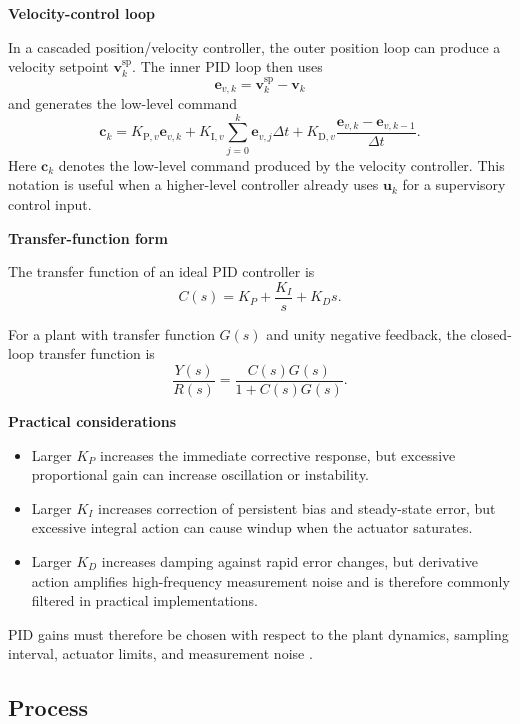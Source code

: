 \documentclass{book}
\providecommand{\ProjectDeepHeading}[2]{%
    \par\medskip\noindent\textbf{#2}\par\smallskip
}
\begin{document}
   \ProjectDeepHeading{2}{Velocity-control loop}
      In a cascaded position/velocity controller, the outer position loop can produce a velocity setpoint $\mathbf{v}^{\mathrm{sp}}_k$. The inner PID loop then uses
      \[
         \mathbf{e}_{v,k}
         =
         \mathbf{v}^{\mathrm{sp}}_k-\mathbf{v}_k
      \]
      and generates the low-level command
      \[
         \mathbf{c}_k
         =
         K_{\mathrm{P},v}\mathbf{e}_{v,k}
         +
         K_{\mathrm{I},v}
         \sum_{j=0}^{k}\mathbf{e}_{v,j}\ensuremath{\Delta} t
         +
         K_{\mathrm{D},v}
         \frac{\mathbf{e}_{v,k}-\mathbf{e}_{v,k-1}}{\ensuremath{\Delta} t}.
      \]
      Here $\mathbf{c}_k$ denotes the low-level command produced by the velocity controller. This notation is useful when a higher-level controller already uses $\mathbf{u}_k$ for a supervisory control input.

   \ProjectDeepHeading{2}{Transfer-function form}
      The transfer function of an ideal PID controller is
      \[
         C(s)
         =
         K_P
         +
         \frac{K_I}{s}
         +
         K_D s.
      \]

      For a plant with transfer function $G(s)$ and unity negative feedback, the closed-loop transfer function is
      \[
         \frac{Y(s)}{R(s)}
         =
         \frac{C(s)G(s)}
              {1+C(s)G(s)}.
      \]

   \ProjectDeepHeading{1}{Practical considerations}
      \begin{itemize}
         \item Larger $K_P$ increases the immediate corrective response, but excessive proportional gain can increase oscillation or instability.
         \item Larger $K_I$ increases correction of persistent bias and steady-state error, but excessive integral action can cause windup when the actuator saturates.
         \item Larger $K_D$ increases damping against rapid error changes, but derivative action amplifies high-frequency measurement noise and is therefore commonly filtered in practical implementations.
      \end{itemize}

      PID gains must therefore be chosen with respect to the plant dynamics, sampling interval, actuator limits, and measurement noise \cite{astrom-2008-feedback-systems-an-introduction-for-scientists-and-engineers}.

\subsection{Process}
\end{document}
